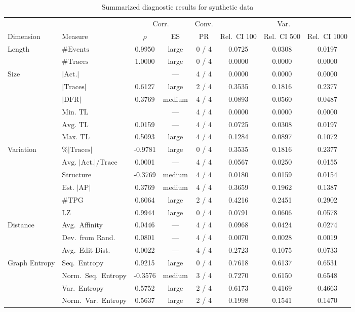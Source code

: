 \begin{table}[ht]
\centering
\setlength{\tabcolsep}{3pt}

\caption{Summarized diagnostic results for synthetic data}
\label{tab:summarized_master_means_synthetic_base}
\begin{tabular}{llcccccc}
\toprule
 & & \multicolumn{2}{c}{Corr.} & Conv. & \multicolumn{3}{c}{Var.} \\
Dimension & Measure & $\rho$ & ES & PR & Rel.\ CI 100 & Rel.\ CI 500 & Rel.\ CI 1000 \\
\midrule
Length & $\#\text{Events}$ & 0.9950 & large & 0 / 4 & 0.0725 & 0.0308 & 0.0197 \\
 & $\#\text{Traces}$ & 1.0000 & large & 0 / 4 & 0.0000 & 0.0000 & 0.0000 \\
\midrule
Size & $|\text{Act.}|$ &  & --- & 4 / 4 & 0.0000 & 0.0000 & 0.0000 \\
 & $|\text{Traces}|$ & 0.6127 & large & 2 / 4 & 0.3535 & 0.1816 & 0.2377 \\
 & $|\text{DFR}|$ & 0.3769 & medium & 4 / 4 & 0.0893 & 0.0560 & 0.0487 \\
 & $\text{Min. TL}$ &  & --- & 4 / 4 & 0.0000 & 0.0000 & 0.0000 \\
 & $\text{Avg. TL}$ & 0.0159 & --- & 4 / 4 & 0.0725 & 0.0308 & 0.0197 \\
 & $\text{Max. TL}$ & 0.5093 & large & 4 / 4 & 0.1284 & 0.0897 & 0.1072 \\
\midrule
Variation & $\%|\text{Traces}|$ & -0.9781 & large & 0 / 4 & 0.3535 & 0.1816 & 0.2377 \\
 & $\text{Avg.\ } | \text{Act.}| /\text{Trace}$ & 0.0001 & --- & 4 / 4 & 0.0567 & 0.0250 & 0.0155 \\
 & $\text{Structure}$ & -0.3769 & medium & 4 / 4 & 0.0180 & 0.0159 & 0.0154 \\
 & $\text{Est.\ } |\text{AP}|$ & 0.3769 & medium & 4 / 4 & 0.3659 & 0.1962 & 0.1387 \\
 & $\#\text{TPG}$ & 0.6064 & large & 2 / 4 & 0.4216 & 0.2451 & 0.2902 \\
 & $\text{LZ}$ & 0.9944 & large & 0 / 4 & 0.0791 & 0.0606 & 0.0578 \\
\midrule
Distance & Avg.\ Affinity & 0.0446 & --- & 4 / 4 & 0.0968 & 0.0424 & 0.0274 \\
 & Dev.\ from Rand. & 0.0801 & --- & 4 / 4 & 0.0070 & 0.0028 & 0.0019 \\
 & Avg.\ Edit Dist. & 0.0022 & --- & 4 / 4 & 0.2723 & 0.1075 & 0.0733 \\
\midrule
Graph Entropy & Seq.\ Entropy & 0.9215 & large & 0 / 4 & 0.7618 & 0.6137 & 0.6531 \\
 & Norm.\ Seq.\ Entropy & -0.3576 & medium & 3 / 4 & 0.7270 & 0.6150 & 0.6548 \\
 & Var.\ Entropy & 0.5752 & large & 2 / 4 & 0.6173 & 0.4169 & 0.4663 \\
 & Norm.\ Var.\ Entropy & 0.5637 & large & 2 / 4 & 0.1998 & 0.1541 & 0.1470 \\
\bottomrule
\end{tabular}


\end{table}
